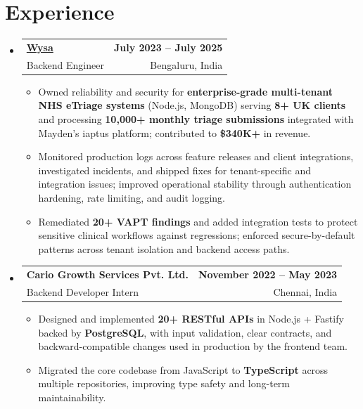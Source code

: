 \documentclass[letterpaper,10pt]{article}
\makeatletter
\newcommand{\resumeItem}[1]{
  \item\small{#1\vspace{-1pt}}
}
\newcommand{\resumeSubheading}[4]{
  \vspace{1pt}\item
    \begin{tabular*}{0.985\textwidth}[t]{l@{\extracolsep{\fill}}r}
      \textbf{#1} & \textbf{\small #2} \\
      {\small\color{ResumeSlate} #3} & {\small\color{ResumeSlate} #4} \\
    \end{tabular*}\vspace{-6pt}
}
\newcommand{\resumeSubHeadingListStart}{\begin{itemize}[leftmargin=0.0in, label={}, itemsep=2pt, topsep=2pt]}
\newcommand{\resumeSubHeadingListEnd}{\end{itemize}}
\newcommand{\resumeItemListStart}{\begin{itemize}[leftmargin=0.18in, itemsep=2pt, topsep=1pt]}
\newcommand{\resumeItemListEnd}{\end{itemize}\vspace{-4pt}}
\makeatother
\begin{document}
\section{Experience}
\resumeSubHeadingListStart
  \resumeSubheading
    {\href{https://www.wysa.io}{Wysa}}{July 2023 -- July 2025}
    {Backend Engineer}{Bengaluru, India}
    \resumeItemListStart
      \resumeItem{Owned reliability and security for \textbf{enterprise-grade multi-tenant NHS eTriage systems} (Node.js, MongoDB) serving \textbf{8+ UK clients} and processing \textbf{10{,}000+ monthly triage submissions} integrated with Mayden's iaptus platform; contributed to \textbf{\$340K+} in revenue.}
      \resumeItem{Monitored production logs across feature releases and client integrations, investigated incidents, and shipped fixes for tenant-specific and integration issues; improved operational stability through authentication hardening, rate limiting, and audit logging.}
      \resumeItem{Remediated \textbf{20+ VAPT findings} and added integration tests to protect sensitive clinical workflows against regressions; enforced secure-by-default patterns across tenant isolation and backend access paths.}
    \resumeItemListEnd
  \resumeSubheading
    {Cario Growth Services Pvt. Ltd.}{November 2022 -- May 2023}
    {Backend Developer Intern}{Chennai, India}
    \resumeItemListStart
      \resumeItem{Designed and implemented \textbf{20+ RESTful APIs} in Node.js + Fastify backed by \textbf{PostgreSQL}, with input validation, clear contracts, and backward-compatible changes used in production by the frontend team.}
      \resumeItem{Migrated the core codebase from JavaScript to \textbf{TypeScript} across multiple repositories, improving type safety and long-term maintainability.}
    \resumeItemListEnd
\resumeSubHeadingListEnd
\vspace{-4pt}
\end{document}

